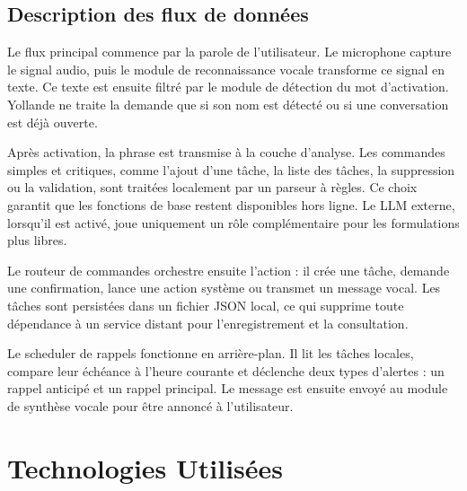\documentclass[12pt,a4paper]{report}
\begin{document}
\section{Description des flux de données}

Le flux principal commence par la parole de l'utilisateur. Le microphone capture
le signal audio, puis le module de reconnaissance vocale transforme ce signal en
texte. Ce texte est ensuite filtré par le module de détection du mot d'activation.
Yollande ne traite la demande que si son nom est détecté ou si une conversation
est déjà ouverte.

Après activation, la phrase est transmise à la couche d'analyse. Les commandes
simples et critiques, comme l'ajout d'une tâche, la liste des tâches, la
suppression ou la validation, sont traitées localement par un parseur à règles.
Ce choix garantit que les fonctions de base restent disponibles hors ligne. Le
LLM externe, lorsqu'il est activé, joue uniquement un rôle complémentaire pour
les formulations plus libres.

Le routeur de commandes orchestre ensuite l'action : il crée une tâche, demande
une confirmation, lance une action système ou transmet un message vocal. Les
tâches sont persistées dans un fichier JSON local, ce qui supprime toute
dépendance à un service distant pour l'enregistrement et la consultation.

Le scheduler de rappels fonctionne en arrière-plan. Il lit les tâches locales,
compare leur échéance à l'heure courante et déclenche deux types d'alertes :
un rappel anticipé et un rappel principal. Le message est ensuite envoyé au
module de synthèse vocale pour être annoncé à l'utilisateur.

\chapter{Technologies Utilisées}
\end{document}
